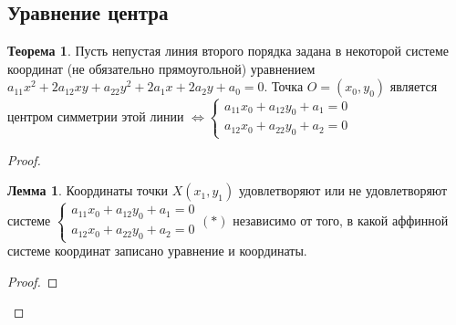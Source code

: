 \documentclass[a4paper, 12pt]{article}
\theoremstyle{definition}
\newtheorem*{theorem}{Теорема}
\newtheorem*{lemma}{Лемма}
\begin{document}
	\subsection{Уравнение центра}
	\begin{theorem}
		Пусть непустая линия второго порядка задана в некоторой системе координат (не обязательно прямоугольной) уравнением $a_{11}x^2 + 2a_{12}xy + a_{22}y^2 + 2a_{1}x + 2a_{2}y + a_{0} = 0$. Точка $O = (x_0, y_0)$ является центром симметрии этой линии $\Leftrightarrow \begin{cases}
			a_{11}x_0+a_{12}y_0+a_1=0\\
			a_{12}x_0+a_{22}y_0+a_2=0
		\end{cases}$ 
	\end{theorem}
	\begin{proof} 
		\begin{lemma}
			Координаты точки $X(x_1, y_1)$ удовлетворяют или не удовлетворяют системе $\begin{cases}a_{11}x_0+a_{12}y_0+a_1=0\\a_{12}x_0+a_{22}y_0+a_2=0 \end{cases} (*)$ независимо от того, в какой аффинной системе координат записано уравнение и координаты.
		\end{lemma}
		\begin{proof}

\end{proof}
\end{proof}
\end{document}

